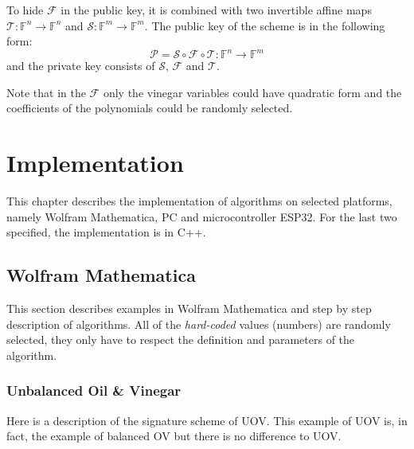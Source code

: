 \documentclass[thesis=M,english]{FITthesis}[2019/12/23]
\begin{document}
\bigskip
\noindent
To hide $\mathcal{F}$ in the public key, it is combined with two invertible affine maps $\mathcal{T}: \mathbb{F}^n \rightarrow \mathbb{F}^n$ and $\mathcal{S}: \mathbb{F}^m \rightarrow \mathbb{F}^m$. The public key of the scheme is in the following form:
\[
\mathcal{P} = \mathcal{S} \circ \mathcal{F} \circ \mathcal{T} : \mathbb{F}^n \rightarrow \mathbb{F}^m
\]
and the private key consists of $\mathcal{S}$, $\mathcal{F}$ and $\mathcal{T}$.

\bigskip
\noindent
Note that in the $\mathcal{F}$ only the vinegar variables could have quadratic form and the coefficients of the polynomials could be randomly selected.

\chapter{Implementation}
This chapter describes the implementation of algorithms on selected platforms, namely Wolfram Mathematica, PC and microcontroller ESP32. For the last two specified, the implementation is in C++.

\section{Wolfram Mathematica}
This section describes examples in Wolfram Mathematica and step by step description of algorithms. All of the \textit{hard-coded} values (numbers) are randomly selected, they only have to respect the definition and parameters of the algorithm.

\subsection{Unbalanced Oil \& Vinegar}
Here is a description of the signature scheme of UOV. This example of UOV is, in fact, the example of balanced OV but there is no difference to UOV.
\end{document}

